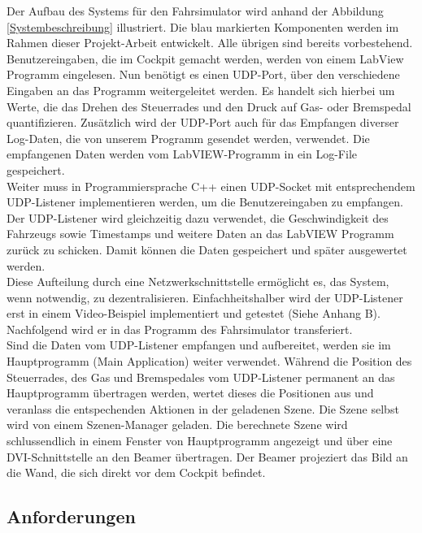Der Aufbau des Systems für den Fahrsimulator wird anhand der Abbildung \ref{Systembeschreibung} illustriert. Die blau markierten Komponenten werden im Rahmen dieser Projekt-Arbeit entwickelt. Alle übrigen sind bereits vorbestehend. \\
Benutzereingaben, die im Cockpit gemacht werden, werden von einem LabView Programm eingelesen. Nun benötigt es einen UDP-Port,  über den verschiedene Eingaben an das Programm weitergeleitet werden. Es handelt sich hierbei um Werte, die das Drehen des Steuerrades und den Druck auf Gas- oder Bremspedal quantifizieren. Zusätzlich wird der UDP-Port auch für das Empfangen diverser Log-Daten, die von unserem Programm gesendet werden, verwendet. Die empfangenen Daten werden vom LabVIEW-Programm  in ein Log-File gespeichert.\\
Weiter  muss in Programmiersprache C++ einen UDP-Socket mit entsprechendem UDP-Listener implementieren werden, um die Benutzereingaben zu empfangen. Der UDP-Listener wird gleichzeitig dazu verwendet, die Geschwindigkeit des Fahrzeugs sowie Timestamps und weitere Daten an das LabVIEW Programm zurück zu schicken. Damit können die Daten gespeichert und später ausgewertet werden.\\
Diese Aufteilung durch eine Netzwerkschnittstelle ermöglicht es,  das System, wenn notwendig, zu dezentralisieren. Einfachheitshalber wird der UDP-Listener erst in einem Video-Beispiel implementiert und getestet (Siehe Anhang B). Nachfolgend wird er in das Programm des Fahrsimulator transferiert.\\
Sind die Daten vom UDP-Listener empfangen und aufbereitet, werden sie im Hauptprogramm (Main Application) weiter verwendet. Während die Position des Steuerrades, des Gas und Bremspedales vom UDP-Listener permanent an das Hauptprogramm übertragen werden, wertet dieses die Positionen aus und veranlass die entspechenden Aktionen in der geladenen Szene. 
Die Szene selbst wird von einem Szenen-Manager geladen. Die berechnete Szene wird schlussendlich in einem Fenster von Hauptprogramm angezeigt und über eine DVI-Schnittstelle an den Beamer übertragen. Der Beamer projeziert das Bild an die Wand, die sich direkt vor dem Cockpit befindet. 

\subsection{Anforderungen}
